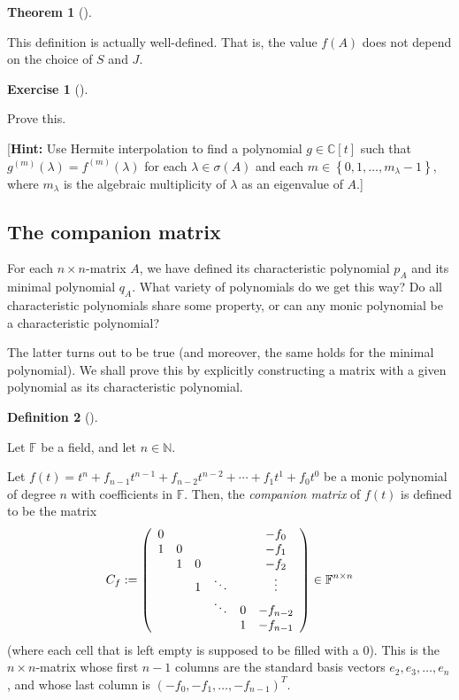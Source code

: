 \documentclass[numbers=enddot,12pt,final,onecolumn,notitlepage]{scrartcl}%
\newcounter{exer}
\numberwithin{exer}{subsection}
\theoremstyle{definition}
\newtheorem{theo}{Theorem}[subsection]
\newenvironment{theorem}[1][]
{\begin{theo}[#1]\begin{leftbar}}
{\end{leftbar}\end{theo}}
\newtheorem{defi}[theo]{Definition}
\newenvironment{definition}[1][]
{\begin{defi}[#1]\begin{leftbar}}
{\end{leftbar}\end{defi}}
\newtheorem{exmp}[exer]{Exercise}
\newenvironment{exercise}[1][]
{\begin{exmp}[#1]\begin{leftbar}}
{\end{leftbar}\end{exmp}}
\begin{document}
\begin{theorem}
This definition is actually well-defined. That is, the value $f\left(
A\right)  $ does not depend on the choice of $S$ and $J$.
\end{theorem}

\begin{exercise}
 Prove this.

[\textbf{Hint:} Use Hermite interpolation to find a polynomial $g\in
\mathbb{C}\left[  t\right]  $ such that $g^{\left(  m\right)  }\left(
\lambda\right)  =f^{\left(  m\right)  }\left(  \lambda\right)  $ for each
$\lambda\in\sigma\left(  A\right)  $ and each $m\in\left\{  0,1,\ldots
,m_{\lambda}-1\right\}  $, where $m_{\lambda}$ is the algebraic multiplicity
of $\lambda$ as an eigenvalue of $A$.]
\end{exercise}

\subsection{The companion matrix}

For each $n\times n$-matrix $A$, we have defined its characteristic polynomial
$p_{A}$ and its minimal polynomial $q_{A}$. What variety of polynomials do we
get this way? Do all characteristic polynomials share some property, or can
any monic polynomial be a characteristic polynomial?

The latter turns out to be true (and moreover, the same holds for the minimal
polynomial). We shall prove this by explicitly constructing a matrix with a
given polynomial as its characteristic polynomial.

\begin{definition}
\label{def.jnf.companion.Cf}Let $\mathbb{F}$ be a field, and let
$n\in\mathbb{N}$.

Let $f\left(  t\right)  =t^{n}+f_{n-1}t^{n-1}+f_{n-2}t^{n-2}+\cdots+f_{1}%
t^{1}+f_{0}t^{0}$ be a monic polynomial of degree $n$ with coefficients in
$\mathbb{F}$. Then, the \emph{companion matrix} of $f\left(  t\right)  $ is
defined to be the matrix%
\[
C_{f}:=\left(
\begin{array}
[c]{cccccc}%
0 &  &  &  &  & -f_{0}\\
1 & 0 &  &  &  & -f_{1}\\
& 1 & 0 &  &  & -f_{2}\\
&  & 1 & \ddots &  & \vdots\\
&  &  & \ddots & 0 & -f_{n-2}\\
&  &  &  & 1 & -f_{n-1}%
\end{array}
\right)  \in\mathbb{F}^{n\times n}%
\]
(where each cell that is left empty is supposed to be filled with a $0$). This
is the $n\times n$-matrix whose first $n-1$ columns are the standard basis
vectors $e_{2},e_{3},\ldots,e_{n}$, and whose last column is $\left(
-f_{0},-f_{1},\ldots,-f_{n-1}\right)  ^{T}$.
\end{definition}
\end{document}
